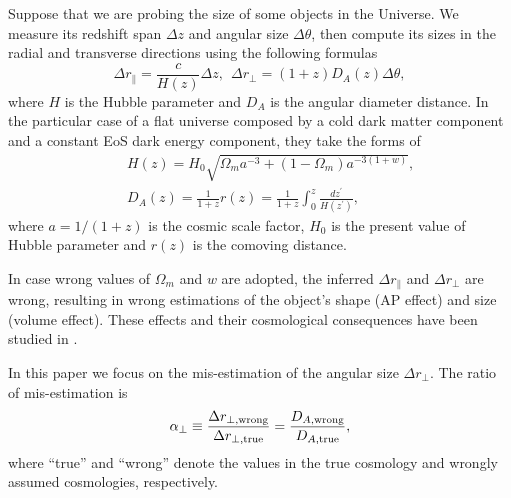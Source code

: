 \documentclass[iop]{emulateapj}
\begin{document}
Suppose that we are probing the size of some objects in the Universe.
We measure its redshift span $\Delta z$ and angular size $\Delta \theta$,
then compute its sizes in the radial and transverse directions using the following formulas
\begin{equation}\label{eq:distance}
\Delta r_{\parallel} = \frac{c}{H(z)}\Delta z,\ \ \Delta r_{\perp}=(1+z)D_A(z)\Delta \theta,
\end{equation}
where $H$ is the Hubble parameter and $D_A$ is the angular diameter distance.
In the particular case of a flat universe composed by a cold dark matter component and a constant EoS dark energy component, they take the forms of
\begin{eqnarray}\label{eq:HDA}
& &H(z) = H_0\sqrt{\Omega_ma^{-3}+(1-\Omega_m)a^{-3(1+w)}},\nonumber\\
& &D_A(z) = \frac{1}{1+z}r(z)=\frac{1}{1+z}\int_0^z \frac{dz^\prime}{H(z^\prime)},
\end{eqnarray}
where $a=1/(1+z)$ is the cosmic scale factor,
$H_0$ is the present value of Hubble parameter and $r(z)$ is the comoving distance.

In case wrong values of $\Omega_m$ and $w$ are adopted, 
the inferred $\Delta r_{\parallel}$ and $\Delta r_{\perp}$ are wrong,
resulting in wrong estimations of the object's shape (AP effect) and size (volume effect).
These effects and their cosmological consequences have been studied in \cite{Li2014,Li2015,Li2016}.

In this paper we focus on the mis-estimation of the angular size $\Delta r_{\perp}$. %
The ratio of mis-estimation is
\begin{equation}\label{eq:DA}
 \alpha_{\perp} \equiv \frac{\Delta r_{\perp, \rm wrong}}{\Delta r_{\perp, \rm true}}
 = \frac{D_{A, \rm wrong}}{D_{A, \rm true}},
\end{equation}
where ``true'' and ``wrong'' denote the values in the true cosmology and wrongly assumed cosmologies, respectively.
\end{document}
